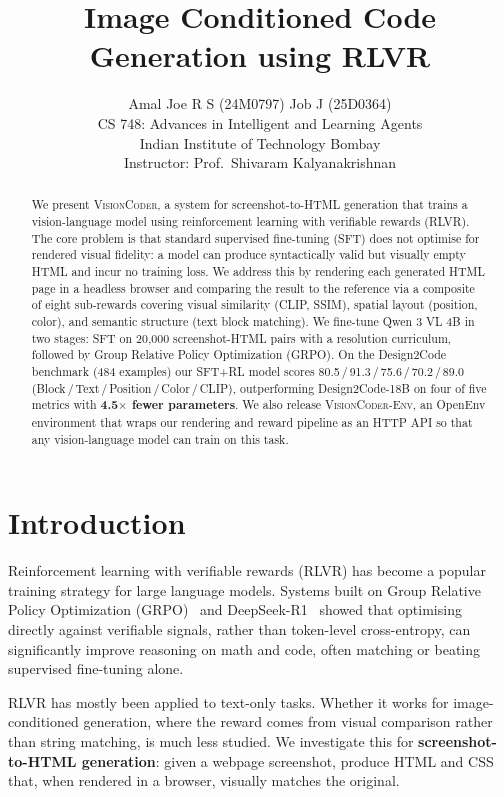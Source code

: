 \documentclass[10pt,twocolumn,letterpaper]{article}
\title{
  \vspace{-0.5cm}
  \textbf{Image Conditioned Code Generation using RLVR}
  \vspace{-0.3cm}
}
\author{
  Amal Joe R S (24M0797) \quad Job J (25D0364)\\[2pt]
  \small CS 748: Advances in Intelligent and Learning Agents\\
  \small Indian Institute of Technology Bombay\\
  \small Instructor: Prof.\ Shivaram Kalyanakrishnan
}
\date{}
\newcommand{\model}[1]{\textsc{#1}}
\begin{document}
\maketitle
\thispagestyle{empty}

\begin{abstract}
\noindent
We present \model{VisionCoder}, a system for screenshot-to-HTML generation
that trains a vision-language model using reinforcement learning with
verifiable rewards (RLVR). The core problem is that standard supervised
fine-tuning (SFT) does not optimise for rendered visual fidelity: a model
can produce syntactically valid but visually empty HTML and incur no training
loss. We address this by rendering each generated HTML page in a headless
browser and comparing the result to the reference via a composite of eight
sub-rewards covering visual similarity (CLIP, SSIM), spatial layout (position,
color), and semantic structure (text block matching). We fine-tune Qwen 3 VL 4B
in two stages: SFT on 20{,}000 screenshot-HTML pairs with a resolution
curriculum, followed by Group Relative Policy Optimization (GRPO). On the
Design2Code benchmark (484 examples) our SFT+RL model scores
80.5\,/\,91.3\,/\,75.6\,/\,70.2\,/\,89.0 (Block\,/\,Text\,/\,Position\,/\,Color\,/\,CLIP),
outperforming Design2Code-18B on four of five metrics with \textbf{4.5$\times$ fewer
parameters}. We also release \model{VisionCoder-Env}, an OpenEnv environment
that wraps our rendering and reward pipeline as an HTTP API so that any
vision-language model can train on this task.
\end{abstract}

\section{Introduction}

Reinforcement learning with verifiable rewards (RLVR) has become a popular
training strategy for large language models.  Systems built on Group Relative
Policy Optimization (GRPO)~\citep{shao2024deepseekmath} and DeepSeek-R1~\citep{deepseek2025r1}
showed that optimising directly against verifiable signals, rather than
token-level cross-entropy, can significantly improve reasoning on math and code,
often matching or beating supervised fine-tuning alone.

RLVR has mostly been applied to text-only tasks.  Whether it works for
image-conditioned generation, where the reward comes from visual comparison
rather than string matching, is much less studied.  We investigate this for
\textbf{screenshot-to-HTML generation}: given a webpage screenshot, produce
HTML and CSS that, when rendered in a browser, visually matches the original.
\end{document}
